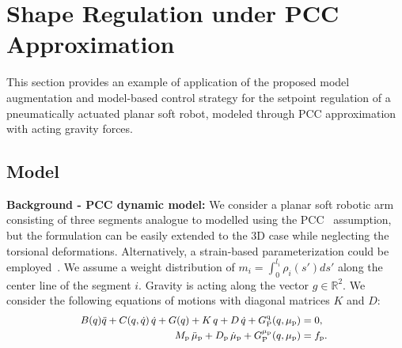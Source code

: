 \section{Shape Regulation under PCC Approximation}
%
This section provides an example of application of the proposed model augmentation and model-based control strategy for the setpoint regulation of a pneumatically actuated planar soft robot, modeled through \gls{PCC} approximation with acting gravity forces. 

\subsection{Model}\label{sub:pcc_model}
\textbf{Background - PCC dynamic model:}
We consider a planar soft robotic arm consisting of three segments analogue to \cite{della2020model} modelled using the \gls{PCC}~\cite{jones2006kinematics} assumption, but the formulation can be easily extended to the 3D case while neglecting the torsional deformations. Alternatively, a strain-based parameterization could be employed~\cite{boyer2020dynamics}. 
We assume a weight distribution of $m_i = \int_{0}^{l_i} \rho_i(s') ds'$ along the center line of the segment $i$. Gravity is acting along the vector $g \in \mathbb{R}^2$. We consider the following equations of motions with diagonal matrices $K$ and $D$:
\begin{equation}\small\label{eq:dynamics_pcc_case}\small
\begin{split}
	B(q)\ddot{q} + C(q,\dot{q}) \, \dot{q} + G(q) + K \, q + D \, \dot{q} + G_{\mathrm{P}}^{\mathrm{q}}(q,\mu_\mathrm{p}) &= 0, \\
	M_\mathrm{p} \, \ddot{\mu}_\mathrm{p} + D_\mathrm{p} \, \dot{\mu}_\mathrm{p} + G_{\mathrm{P}}^{\mu_\mathrm{p}}(q,\mu_\mathrm{p}) &= f_\mathrm{p}. \; 
\end{split}
\end{equation}

